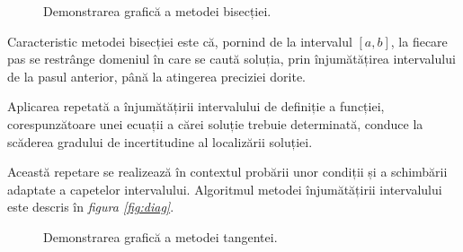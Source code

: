 \begin{figure}[H]
    \centering
    
    \caption{Demonstrarea grafică a metodei bisecției.}
    \label{fig:bisection-figure}
\end{figure}

Caracteristic metodei bisecției este că, pornind de la intervalul $[a,b]$, la fiecare 
pas se restrânge domeniul în care se caută soluția, prin înjumătățirea intervalului 
de la pasul anterior, până la atingerea preciziei dorite. \par

Aplicarea repetată a înjumătățirii intervalului de definiție a funcției, corespunzătoare 
unei ecuații a cărei soluție trebuie determinată, conduce la scăderea gradului de 
incertitudine al localizării soluției. \par

Această repetare se realizează în contextul probării unor condiții și a schimbării 
adaptate a capetelor intervalului. Algoritmul metodei înjumătățirii intervalului este 
descris în \textit{figura \ref{fig:diag}}.

\begin{figure}[H]
    \centering
    
    \caption{Demonstrarea grafică a metodei tangentei.}
    \label{fig:tangent-figure}
\end{figure}

\clearpage

